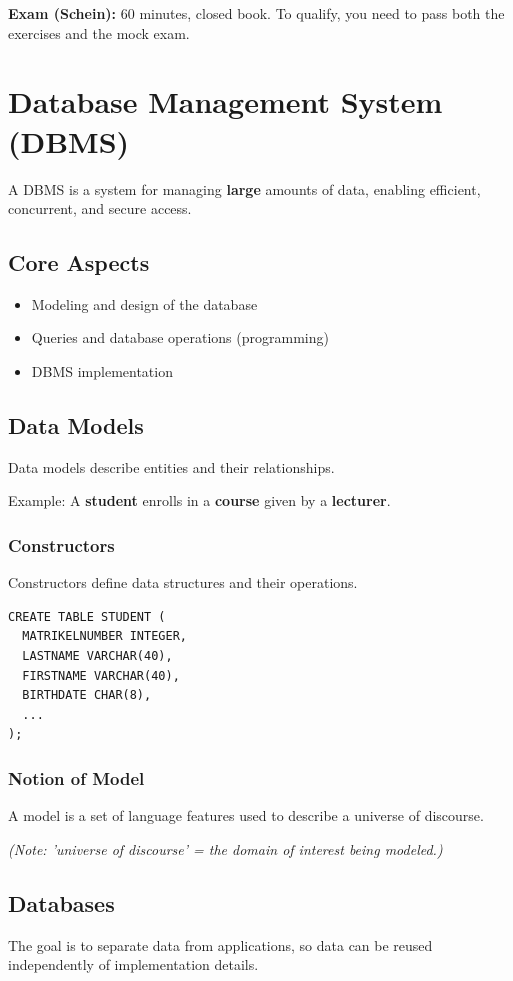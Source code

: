 \documentclass{article}
\begin{document}
\textbf{Exam (Schein):} 60 minutes, closed book.  
To qualify, you need to pass both the exercises and the mock exam.

\section{Database Management System (DBMS)}
A DBMS is a system for managing \textbf{large} amounts of data, enabling efficient, concurrent, and secure access.

\subsection{Core Aspects}
\begin{itemize}
  \item Modeling and design of the database
  \item Queries and database operations (programming)
  \item DBMS implementation
\end{itemize}

\subsection{Data Models}
Data models describe entities and their relationships.

Example: A \textbf{student} enrolls in a \textbf{course} given by a \textbf{lecturer}.

\subsubsection{Constructors}
Constructors define data structures and their operations.

\begin{lstlisting}
CREATE TABLE STUDENT (
  MATRIKELNUMBER INTEGER,
  LASTNAME VARCHAR(40),
  FIRSTNAME VARCHAR(40),
  BIRTHDATE CHAR(8),
  ...
);
\end{lstlisting}

\subsubsection{Notion of Model}
A model is a set of language features used to describe a universe of discourse.

\textit{(Note: 'universe of discourse' = the domain of interest being modeled.)}

\subsection{Databases}
The goal is to separate data from applications, so data can be reused independently of implementation details.
\end{document}
